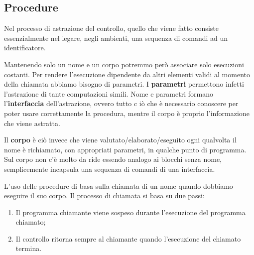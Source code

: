\documentclass[oneside,a4paper,11pt]{book}
\theoremstyle{italicstyle}
\theoremstyle{normStyle}
\begin{document}
\subsection{Procedure}
Nel processo di astrazione del controllo, quello che viene fatto consiste essenzialmente nel legare, negli 
ambienti, una sequenza di comandi ad un identificatore.

Mantenendo solo un nome e un corpo potremmo però associare solo esecuzioni costanti.
Per rendere l'esecuzione dipendente da altri elementi validi al momento della chiamata abbiamo bisogno
di parametri. I \textbf{parametri} permettono infetti l'astrazione di tante computazioni simili.
Nome e parametri formano l'\textbf{interfaccia} dell'astrazione, ovvero tutto c
iò che è necessario conoscere per poter usare correttamente la procedura, mentre 
il corpo è proprio l'informazione che viene astratta.

Il \textbf{corpo} è ciò invece che viene valutato/elaborato/eseguito ogni qualvolta il nome è richiamato,
con appropriati parametri, in qualche punto di programma. Sul corpo non c'è molto 
da ride essendo analogo ai blocchi senza nome, semplicemente incapsula 
una sequenza di comandi di una interfaccia.

L'uso delle procedure di basa sulla chiamata di un nome quando dobbiamo 
eseguire il suo corpo. Il processo di chiamata si basa su due passi:
\begin{enumerate}
  \item Il programma chiamante viene sospeso durante l'esecuzione del programma chiamato;
  \item Il controllo ritorna sempre al chiamante quando l'esecuzione del chiamato termina.
\end{enumerate}
\end{document}
